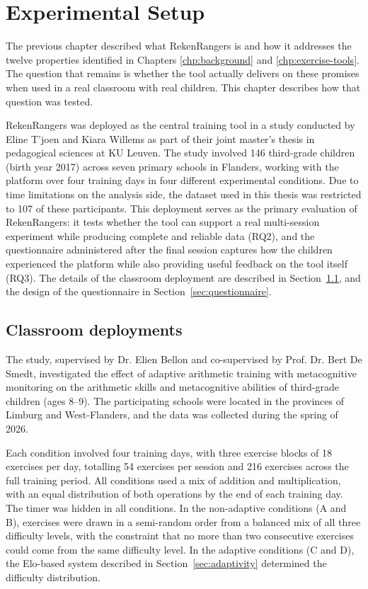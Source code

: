 \chapter{Experimental Setup}
\label{chp:experimental-setup}
The previous chapter described what RekenRangers is and how it addresses the twelve properties identified in Chapters \ref{chp:background} and \ref{chp:exercise-tools}. The question that remains is whether the tool actually delivers on these promises when used in a real classroom with real children. This chapter describes how that question was tested.

RekenRangers was deployed as the central training tool in a study conducted by Eline T'joen and Kiara Willems as part of their joint master's thesis in pedagogical sciences at KU Leuven. The study involved 146 third-grade children (birth year 2017) across seven primary schools in Flanders, working with the platform over four training days in four different experimental conditions. Due to time limitations on the analysis side, the dataset used in this thesis was restricted to 107 of these participants. This deployment serves as the primary evaluation of RekenRangers: it tests whether the tool can support a real multi-session experiment while producing complete and reliable data (RQ2), and the questionnaire administered after the final session captures how the children experienced the platform while also providing useful feedback on the tool itself (RQ3). The details of the classroom deployment are described in Section~\ref{sec:deployment}, and the design of the questionnaire in Section~\ref{sec:questionnaire}.

\section{Classroom deployments}
\label{sec:deployment}
The study, supervised by Dr. Elien Bellon and co-supervised by Prof. Dr. Bert De Smedt, investigated the effect of adaptive arithmetic training with metacognitive monitoring on the arithmetic skills and metacognitive abilities of third-grade children (ages 8--9). The participating schools were located in the provinces of Limburg and West-Flanders, and the data was collected during the spring of 2026.

Each condition involved four training days, with three exercise blocks of 18 exercises per day, totalling 54 exercises per session and 216 exercises across the full training period. All conditions used a mix of addition and multiplication, with an equal distribution of both operations by the end of each training day. The timer was hidden in all conditions. In the non-adaptive conditions (A and B), exercises were drawn in a semi-random order from a balanced mix of all three difficulty levels, with the constraint that no more than two consecutive exercises could come from the same difficulty level. In the adaptive conditions (C and D), the Elo-based system described in Section~\ref{sec:adaptivity} determined the difficulty distribution.

